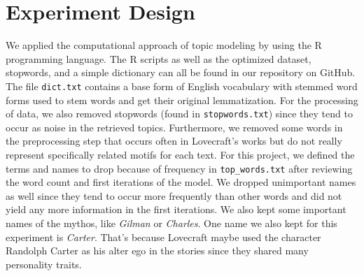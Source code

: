 \section{Experiment Design}

We applied the computational approach of topic modeling by using the R programming language. 
The R scripts as well as the optimized dataset, 
stopwords, and a simple dictionary can all be found in our repository on GitHub. The file \texttt{dict.txt} 
contains a base form of English vocabulary with stemmed word forms used to stem words and get their 
original lemmatization. For the processing of data, we also removed stopwords (found in \texttt{stopwords.txt}) 
since they tend to occur as noise in the retrieved topics. Furthermore, we removed some words in the 
preprocessing step that occurs often in Lovecraft's works but do not really represent specifically 
related motifs for each text. For this project, we defined the terms and names to drop because of 
frequency in \texttt{top\_words.txt} after reviewing the word count and first iterations of the model. We 
dropped unimportant names as well since they tend to occur more frequently than other words and 
did not yield any more information in the first iterations. We also kept some important names of the 
mythos, like \textit{Gilman} or \textit{Charles}. One name we also kept for this experiment 
is \textit{Carter}. That's because Lovecraft maybe used the character Randolph Carter as his alter ego in 
the stories since they shared many personality traits.\\

